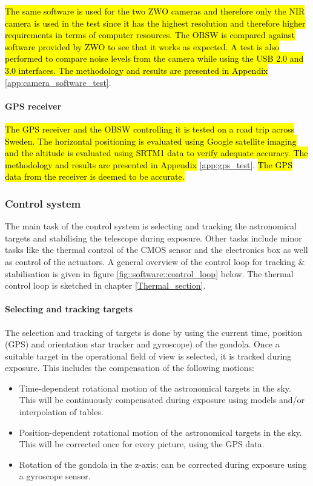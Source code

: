 \hl{The same software is used for the two ZWO cameras and therefore only the NIR camera is used in the test since it has the highest resolution and therefore higher requirements in terms of computer resources. The OBSW is compared against software provided by ZWO to see that it works as expected. A test is also performed to compare noise levels from the camera while using the USB 2.0 and 3.0 interfaces. The methodology and results are presented in Appendix} \ref{app:camera_software_test}.

\paragraph{GPS receiver}

\hl{The GPS receiver and the OBSW controlling it is tested on a road trip across Sweden. The horizontal positioning is evaluated using Google satellite imaging and the altitude is evaluated using SRTM1 data to verify adequate accuracy. The methodology and results are presented in Appendix} \ref{app:gps_test}. \hl{The GPS data from the receiver is deemed to be accurate.}


\subsubsection{Control system}
The main task of the control system is selecting and tracking the astronomical targets and stabilising the telescope during exposure. Other tasks include minor tasks like the thermal control of the CMOS sensor and the electronics box as well as control of the actuators. A general overview of the control loop for tracking \& stabilisation is given in figure  \mbox{\ref{fig::software::control_loop}} below. The thermal control loop is sketched in chapter \mbox{\ref{Thermal_section}}.

\paragraph{Selecting and tracking targets}

The selection and tracking of targets is done by using the current time, position (GPS) and orientation star tracker and gyroscope) of the gondola. Once a suitable target in the operational field of view is selected, it is tracked during exposure. This includes the compensation of the following motions:
\begin{itemize}
	\item Time-dependent rotational motion of the astronomical targets in the sky. This will be continuously compensated during exposure using models and/or interpolation of tables.
	\item Position-dependent rotational motion of the astronomical targets in the sky. This will be corrected once for every picture, using the GPS data.
	\item Rotation of the gondola in the z-axis; can be corrected during exposure using a gyroscope sensor.
\end{itemize}

